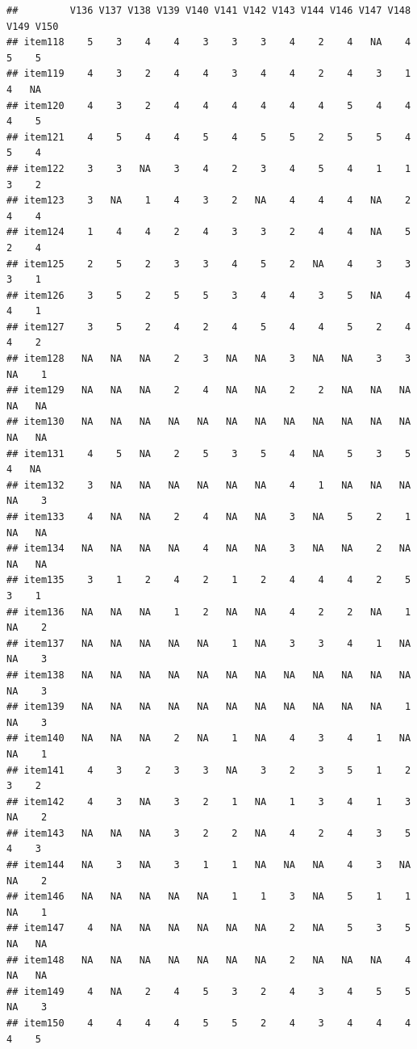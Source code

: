 \documentclass[
  man]{apa6}
\begin{document}
\begin{verbatim}
##         V136 V137 V138 V139 V140 V141 V142 V143 V144 V146 V147 V148 V149 V150
## item118    5    3    4    4    3    3    3    4    2    4   NA    4    5    5
## item119    4    3    2    4    4    3    4    4    2    4    3    1    4   NA
## item120    4    3    2    4    4    4    4    4    4    5    4    4    4    5
## item121    4    5    4    4    5    4    5    5    2    5    5    4    5    4
## item122    3    3   NA    3    4    2    3    4    5    4    1    1    3    2
## item123    3   NA    1    4    3    2   NA    4    4    4   NA    2    4    4
## item124    1    4    4    2    4    3    3    2    4    4   NA    5    2    4
## item125    2    5    2    3    3    4    5    2   NA    4    3    3    3    1
## item126    3    5    2    5    5    3    4    4    3    5   NA    4    4    1
## item127    3    5    2    4    2    4    5    4    4    5    2    4    4    2
## item128   NA   NA   NA    2    3   NA   NA    3   NA   NA    3    3   NA    1
## item129   NA   NA   NA    2    4   NA   NA    2    2   NA   NA   NA   NA   NA
## item130   NA   NA   NA   NA   NA   NA   NA   NA   NA   NA   NA   NA   NA   NA
## item131    4    5   NA    2    5    3    5    4   NA    5    3    5    4   NA
## item132    3   NA   NA   NA   NA   NA   NA    4    1   NA   NA   NA   NA    3
## item133    4   NA   NA    2    4   NA   NA    3   NA    5    2    1   NA   NA
## item134   NA   NA   NA   NA    4   NA   NA    3   NA   NA    2   NA   NA   NA
## item135    3    1    2    4    2    1    2    4    4    4    2    5    3    1
## item136   NA   NA   NA    1    2   NA   NA    4    2    2   NA    1   NA    2
## item137   NA   NA   NA   NA   NA    1   NA    3    3    4    1   NA   NA    3
## item138   NA   NA   NA   NA   NA   NA   NA   NA   NA   NA   NA   NA   NA    3
## item139   NA   NA   NA   NA   NA   NA   NA   NA   NA   NA   NA    1   NA    3
## item140   NA   NA   NA    2   NA    1   NA    4    3    4    1   NA   NA    1
## item141    4    3    2    3    3   NA    3    2    3    5    1    2    3    2
## item142    4    3   NA    3    2    1   NA    1    3    4    1    3   NA    2
## item143   NA   NA   NA    3    2    2   NA    4    2    4    3    5    4    3
## item144   NA    3   NA    3    1    1   NA   NA   NA    4    3   NA   NA    2
## item146   NA   NA   NA   NA   NA    1    1    3   NA    5    1    1   NA    1
## item147    4   NA   NA   NA   NA   NA   NA    2   NA    5    3    5   NA   NA
## item148   NA   NA   NA   NA   NA   NA   NA    2   NA   NA   NA    4   NA   NA
## item149    4   NA    2    4    5    3    2    4    3    4    5    5   NA    3
## item150    4    4    4    4    5    5    2    4    3    4    4    4    4    5

\end{verbatim}
\end{document}
